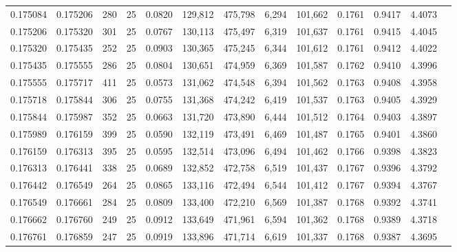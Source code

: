 \begin{tabular}{rrrrrrrrrrrrr}
0.175084 & 0.175206 &   280 &  25 &                                     0.0820 & 129,812 & 475,798 &   6,294 & 101,662 & 0.1761 & 0.9417 & 4.4073 \\
0.175206 & 0.175320 &   301 &  25 &                                     0.0767 & 130,113 & 475,497 &   6,319 & 101,637 & 0.1761 & 0.9415 & 4.4045 \\
0.175320 & 0.175435 &   252 &  25 &                                     0.0903 & 130,365 & 475,245 &   6,344 & 101,612 & 0.1761 & 0.9412 & 4.4022 \\
0.175435 & 0.175555 &   286 &  25 &                                     0.0804 & 130,651 & 474,959 &   6,369 & 101,587 & 0.1762 & 0.9410 & 4.3996 \\
0.175555 & 0.175717 &   411 &  25 &                                     0.0573 & 131,062 & 474,548 &   6,394 & 101,562 & 0.1763 & 0.9408 & 4.3958 \\
0.175718 & 0.175844 &   306 &  25 &                                     0.0755 & 131,368 & 474,242 &   6,419 & 101,537 & 0.1763 & 0.9405 & 4.3929 \\
0.175844 & 0.175987 &   352 &  25 &                                     0.0663 & 131,720 & 473,890 &   6,444 & 101,512 & 0.1764 & 0.9403 & 4.3897 \\
0.175989 & 0.176159 &   399 &  25 &                                     0.0590 & 132,119 & 473,491 &   6,469 & 101,487 & 0.1765 & 0.9401 & 4.3860 \\
0.176159 & 0.176313 &   395 &  25 &                                     0.0595 & 132,514 & 473,096 &   6,494 & 101,462 & 0.1766 & 0.9398 & 4.3823 \\
0.176313 & 0.176441 &   338 &  25 &                                     0.0689 & 132,852 & 472,758 &   6,519 & 101,437 & 0.1767 & 0.9396 & 4.3792 \\
0.176442 & 0.176549 &   264 &  25 &                                     0.0865 & 133,116 & 472,494 &   6,544 & 101,412 & 0.1767 & 0.9394 & 4.3767 \\
0.176549 & 0.176661 &   284 &  25 &                                     0.0809 & 133,400 & 472,210 &   6,569 & 101,387 & 0.1768 & 0.9392 & 4.3741 \\
0.176662 & 0.176760 &   249 &  25 &                                     0.0912 & 133,649 & 471,961 &   6,594 & 101,362 & 0.1768 & 0.9389 & 4.3718 \\
0.176761 & 0.176859 &   247 &  25 &                                     0.0919 & 133,896 & 471,714 &   6,619 & 101,337 & 0.1768 & 0.9387 & 4.3695 \\

\end{tabular}
